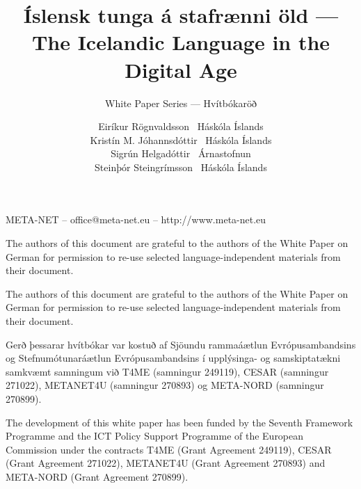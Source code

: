 \documentclass{../../metanetpaper}
\title{Íslensk tunga á stafrænni öld --- The Icelandic Language in the Digital Age}
\subtitle{White Paper Series --- Hvítbókaröð}
\author{
  Eiríkur Rögnvaldsson~ {\small Háskóla Íslands}\\
  Kristín M. Jóhannsdóttir~ {\small Háskóla Íslands}\\
  Sigrún Helgadóttir~ {\small Árnastofnun} \\
  Steinþór Steingrímsson~ {\small Háskóla Íslands}
}
\begin{document}

\maketitle

\null
\pagestyle{empty} 

\centerline{META-NET -- office@meta-net.eu -- http://www.meta-net.eu}

\vfill

\begin{small}
  The authors of this document are grateful to the authors of the White Paper on German for permission to re-use selected language-independent materials from their document.  
\end{small}

\bigskip
\begin{small}
  The authors of this document are grateful to the authors of the White Paper on German for permission to re-use selected language-independent materials from their document.  
\end{small}

\bigskip

\begin{small}
Gerð þessarar hvítbókar var kostuð af Sjöundu rammaáætlun Evrópusambandsins og Stefnumótunaráætlun Evrópusambandsins í upplýsinga- og samskiptatækni samkvæmt samningum við T4ME (samningur 249119), CESAR (samningur 271022), META\-NET4U (samningur 270893) og META-NORD (samningur 270899).
\end{small}

\bigskip
\begin{small}
  The development of this white paper has been funded by the Seventh
  Framework Programme and the ICT Policy Support Programme of the
  European Commission under the contracts T4ME (Grant Agreement 249119),
  CESAR (Grant Agreement 271022), META\-NET4U (Grant Agreement 270893)
  and META-NORD (Grant Agreement 270899).
\end{small}

\clearpage

\setcounter{page}{5}
\pagestyle{scrheadings}

\cleardoublepage

\end{document}
